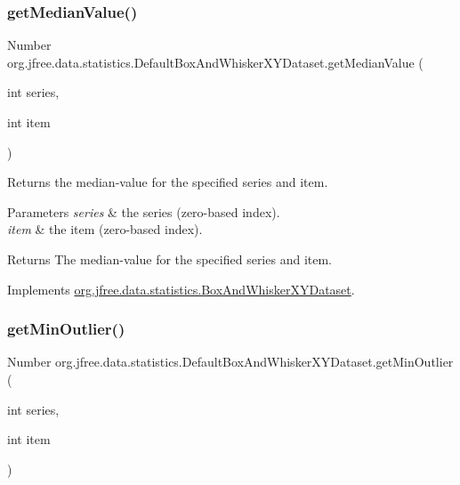 \subsubsection{\texorpdfstring{get\+Median\+Value()}{getMedianValue()}}
{\footnotesize\ttfamily Number org.\+jfree.\+data.\+statistics.\+Default\+Box\+And\+Whisker\+X\+Y\+Dataset.\+get\+Median\+Value (\begin{DoxyParamCaption}\item[{int}]{series,  }\item[{int}]{item }\end{DoxyParamCaption})}

Returns the median-\/value for the specified series and item.


\begin{DoxyParams}{Parameters}
{\em series} & the series (zero-\/based index). \\
\hline
{\em item} & the item (zero-\/based index).\\
\hline
\end{DoxyParams}
\begin{DoxyReturn}{Returns}
The median-\/value for the specified series and item. 
\end{DoxyReturn}


Implements \mbox{\hyperlink{interfaceorg_1_1jfree_1_1data_1_1statistics_1_1_box_and_whisker_x_y_dataset_aaf7ccfc01f6781e32bf674818aba2a7f}{org.\+jfree.\+data.\+statistics.\+Box\+And\+Whisker\+X\+Y\+Dataset}}.

\mbox{\label{classorg_1_1jfree_1_1data_1_1statistics_1_1_default_box_and_whisker_x_y_dataset_a0bf29647538b91763c23cb07f6aadf6c}} 
\subsubsection{\texorpdfstring{get\+Min\+Outlier()}{getMinOutlier()}}
{\footnotesize\ttfamily Number org.\+jfree.\+data.\+statistics.\+Default\+Box\+And\+Whisker\+X\+Y\+Dataset.\+get\+Min\+Outlier (\begin{DoxyParamCaption}\item[{int}]{series,  }\item[{int}]{item }\end{DoxyParamCaption})}

